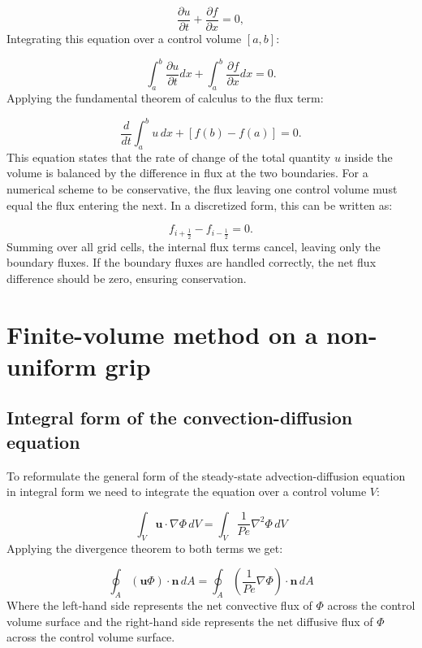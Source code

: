 \documentclass{article}
\begin{document}
\begin{equation}
    \frac{\partial u}{\partial t} + \frac{\partial f}{\partial x} = 0,
\end{equation}
Integrating this equation over a control volume $[a, b]$:

\begin{equation}
    \int_{a}^{b} \frac{\partial u}{\partial t} dx + \int_{a}^{b} \frac{\partial f}{\partial x} dx = 0.
\end{equation}
Applying the fundamental theorem of calculus to the flux term:

\begin{equation}
    \frac{d}{dt} \int_{a}^{b} u \, dx + \left[ f(b) - f(a) \right] = 0.
\end{equation}
This equation states that the rate of change of the total quantity $u$ inside the volume is balanced by the difference in flux at the two boundaries.
For a numerical scheme to be conservative, the flux leaving one control volume must equal the flux entering the next. In a discretized form, this can be written as:

\begin{equation}
    f_{i+\frac{1}{2}} - f_{i-\frac{1}{2}} = 0.
\end{equation}
Summing over all grid cells, the internal flux terms cancel, leaving only the boundary fluxes. If the boundary fluxes are handled correctly, 
the net flux difference should be zero, ensuring conservation.


\section{Finite-volume method on a non-uniform grip}

\subsection{Integral form of the convection-diffusion equation}

To reformulate the general form of the steady-state advection-diffusion equation in integral form we need to integrate the equation
over a control volume \( V \):

\[
\int_V \mathbf{u} \cdot \nabla \Phi \, dV = \int_V \frac{1}{Pe} \nabla^2 \Phi \, dV
\]
Applying the divergence theorem to both terms we get:

\[
\oint_A (\mathbf{u} \Phi) \cdot \mathbf{n} \, dA = \oint_A \left( \frac{1}{Pe} \nabla \Phi \right) \cdot \mathbf{n} \, dA
\]
Where the left-hand side represents the net convective flux of \( \Phi \) across the control volume surface 
and the right-hand side represents the net diffusive flux of \( \Phi \) across the control volume surface.
\end{document}
